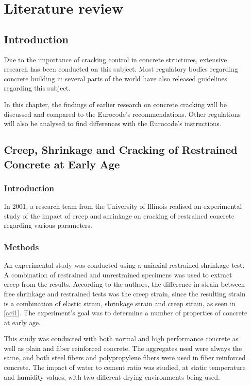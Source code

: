 \documentclass[a4paper,11pt]{memoir}
\begin{document}
\chapter{Literature review}

\section{Introduction}
Due to the importance of cracking control in concrete structures, extensive
research has been conducted on this subject. Most regulatory bodies regarding
concrete building in several parts of the world have also released guidelines
regarding this subject.

In this chapter, the findings of earlier research on concrete cracking will be
discussed and compared to the Eurocode's recommendations. Other regulations
will also be analysed to find differences with the Eurocode's instructions.

\section[Creep, Shrinkage and Cracking of Restrained Concrete at Early Age]
{Creep, Shrinkage and Cracking of Restrained Concrete at Early Age
\cite{cscea}}
\subsection{Introduction}
In 2001, a research team from the University of Illinois realised an
experimental study of the impact of creep and shrinkage on cracking of
restrained concrete regarding various parameters.

\subsection{Methods}
An experimental study was conducted using a uniaxial restrained shrinkage test.
A combination of restrained and unrestrained specimens was used to extract
creep from the results. According to the authors, the difference in strain
between free shrinkage and restrained tests was the creep strain, since the
resulting strain is a combination of elastic strain, shrinkage strain and creep
strain, as seen in
\autoref{aci1}. The experiment's goal was to determine a number of properties
of concrete at early age.

This study was conducted with both normal and high performance concrete as
well as plain and fiber reinforced concrete. The aggregates used were always
the same, and both steel fibers and polypropylene fibers were used in fiber
reinforced concrete. The impact of water to cement ratio was studied, at
static temperature and humidity values, with two different drying environments
being used.
\end{document}

